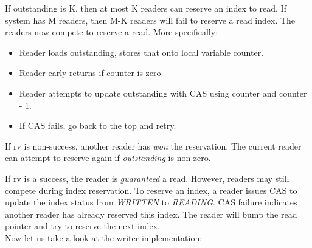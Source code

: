 If outstanding is K, then at most K readers can reserve an index to read. If system 
has M readers, then M-K readers will fail to reserve a read index. The readers now 
compete to reserve a read. More specifically: 
\begin{itemize}
    \item Reader loads outstanding, stores that onto local variable counter.
    \item Reader early returns if counter is zero 
    \item Reader attempts to update outstanding with CAS using counter and counter - 1.
    \item If CAS fails, go back to the top and retry.
\end{itemize}

If rv is non-success, another reader has \textit{won} the reservation. The
current reader can attempt to reserve again if \textit{outstanding} is
non-zero.\newline

If rv is a success, the reader is \textit{guaranteed} a read. However, readers
may still compete during index reservation. To reserve an index, a reader issues
CAS to update the index status from \textit{WRITTEN} to \textit{READING}. CAS
failure indicates another reader has already reserved this index. The reader
will bump the read pointer and try to reserve the next index.\\

Now let us take a look at the writer implementation:\\

